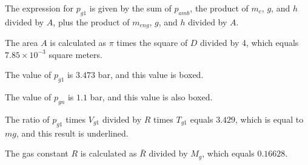 The expression for \( p_{g1} \) is given by the sum of \( p_{amb} \), the product of \( m_c \), \( g \), and \( h \) divided by \( A \), plus the product of \( m_{eng} \), \( g \), and \( h \) divided by \( A \).

The area \( A \) is calculated as \( \pi \) times the square of \( D \) divided by 4, which equals \( 7.85 \times 10^{-3} \) square meters.

The value of \( p_{g1} \) is \( 3.473 \) bar, and this value is boxed.

The value of \( p_{gn} \) is \( 1.1 \) bar, and this value is also boxed.

The ratio of \( p_{g1} \) times \( V_{g1} \) divided by \( R \) times \( T_{g1} \) equals \( 3.429 \), which is equal to \( mg \), and this result is underlined.

The gas constant \( R \) is calculated as \( \bar{R} \) divided by \( M_g \), which equals \( 0.16628 \).
